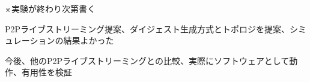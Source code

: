 ※実験が終わり次第書く

P2Pライブストリーミング提案、ダイジェスト生成方式とトポロジを提案、シミュレーションの結果よかった

今後、他のP2Pライブストリーミングとの比較、実際にソフトウェアとして動作、有用性を検証


